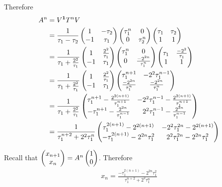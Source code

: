 Therefore
\begin{align*}
  A^n &= V^{\mathbf 1}T^nV\\
      &= \frac{1}{\tau_1 - \tau_2}
        \begin{pmatrix}1 & -\tau_2\\-1 & \tau_1\\ \end{pmatrix}
        \begin{pmatrix}\tau_1^n & 0\\0 & \tau_2^n\\ \end{pmatrix}
        \begin{pmatrix}\tau_1 & \tau_2\\1 & 1\\ \end{pmatrix}\\
      &= \frac{1}{\tau_1 + \frac{2^2}{\tau_1}}
        \begin{pmatrix}1 & \frac{2^2}{\tau_1}\\-1 & \tau_1\\ \end{pmatrix}
        \begin{pmatrix}\tau_1^n & 0\\0 & \frac{-2^{2n}}{\tau_1^n}\\ \end{pmatrix}
        \begin{pmatrix}\tau_1 & \frac{-2^2}
        {\tau_1}\\1 & 1\\ \end{pmatrix}\\
      &= \frac{1}{\tau_1 + \frac{2^2}{\tau_1}}
        \begin{pmatrix}1 & \frac{2^2}{\tau_1}\\-1 & \tau_1\\ \end{pmatrix}
        \begin{pmatrix}\tau_1^{n+1} & -2^2\tau_1^{n-1}\\\frac{-2^{2n}}{\tau_1^n} & \frac{-2^{2n}}{\tau_1^n}\\ \end{pmatrix}\\
      &= \frac{1}{\tau_1 + \frac{2^2}{\tau_1}}
        \begin{pmatrix}\tau_1^{n+1} -\frac{2^{2(n+1)}}{\tau_1^{n+1}} & -2^2\tau_1^{n-1} - \frac{2^{2(n+1)}}{\tau_1^{n+1}}\\-\tau_1^{n+1} - \frac{2^{2n}}{\tau_1^{n-1}} & 2^2\tau_1^{n-1} - \frac{2^{2n}}{\tau_1^{n-1}}\\ \end{pmatrix}\\
      &= \frac{1}{\tau_1^{n+2} + 2^2\tau_1^n}
        \begin{pmatrix}\tau_1^{2(n+1)} - 2^{2(n+1)} & -2^2\tau_1^{2n} - 2^{2(n+1)}\\-\tau_1^{2(n+1)} - 2^{2n}\tau_1^2 & 2^2\tau_1^{2n} - 2^{2n}\tau_1^2\\ \end{pmatrix}\\
\end{align*}

Recall that $\begin{pmatrix}x_{n+1}\\x_n\end{pmatrix} = A^n\begin{pmatrix}1\\0\end{pmatrix}$. Therefore
\begin{align*}
  x_n = \frac
  {-\tau_1^{2(n+1)} - 2^{2n}\tau_1^2}
  {\tau_1^{n+2} + 2^2\tau_1^n}
\end{align*}





